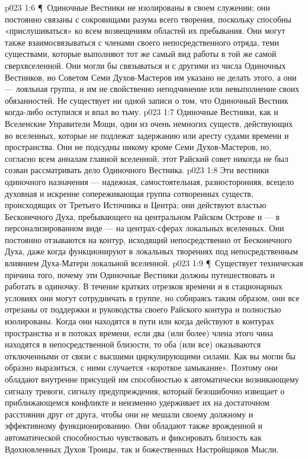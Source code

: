 \vs p023 1:6 \P\ Одиночные Вестники не изолированы в своем служении; они постоянно связаны с сокровищами разума всего творения, поскольку способны «прислушиваться» ко всем возвещениям областей их пребывания. Они могут также взаимосвязываться с членами своего непосредственного отряда, теми существами, которые выполняют тот же самый вид работы в той же самой сверхвселенной. Они могли бы связываться и с другими из числа Одиночных Вестников, но Советом Семи Духов\hyp{}Мастеров им указано не делать этого, а они --- лояльная группа, и им не свойственно неподчинение или невыполнение своих обязанностей. Не существует ни одной записи о том, что Одиночный Вестник когда\hyp{}либо оступился и впал во тьму.
\vs p023 1:7 Одиночные Вестники, как и Вселенские Управители Мощи, одни из очень немногих существ, действующих во вселенных, которые не подлежат задержанию или аресту судами времени и пространства. Они не подсудны никому кроме Семи Духов\hyp{}Мастеров, но, согласно всем анналам главной вселенной, этот Райский совет никогда не был созван рассматривать дело Одиночного Вестника.
\vs p023 1:8 Эти вестники одиночного назначения --- надежная, самостоятельная, разносторонняя, всецело духовная и искренне сопереживающая группа сотворенных существ, происходящих от Третьего Источника и Центра; они действуют властью Бесконечного Духа, пребывающего на центральном Райском Острове и --- в персонализированном виде --- на центрах\hyp{}сферах локальных вселенных. Они постоянно отзываются на контур, исходящий непосредственно от Бесконечного Духа, даже когда функционируют в локальных творениях под непосредственным влиянием Духа\hyp{}Матери локальной вселенной.
\vs p023 1:9 \P\ Существует техническая причина того, почему эти Одиночные Вестники должны путешествовать и работать в одиночку. В течение кратких отрезков времени и в стационарных условиях они могут сотрудничать в группе, но собираясь таким образом, они все отрезаны от поддержки и руководства своего Райского контура и полностью изолированы. Когда они находятся в пути или когда действуют в контурах пространства и в потоках времени, если два (или более) члена этого чина находятся в непосредственной близости, то оба (или все) оказываются отключенными от связи с высшими циркулирующими силами. Как вы могли бы образно выразиться, с ними случается «короткое замыкание». Поэтому они обладают внутренне присущей им способностью к автоматически возникающему сигналу тревоги, сигналу предупреждения, который безошибочно извещает о приближающемся конфликте и неизменно удерживает их на достаточном расстоянии друг от друга, чтобы они не мешали своему должному и эффективному функционированию. Они обладают также врожденной и автоматической способностью чувствовать и фиксировать близость как Вдохновленных Духов Троицы, так и божественных Настройщиков Мысли.
